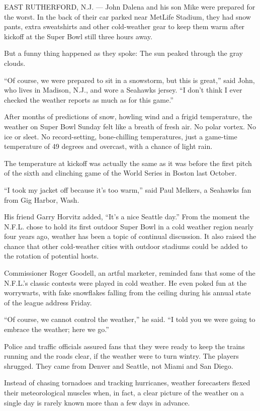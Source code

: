 EAST RUTHERFORD, N.J. --- John Dalena and his son Mike were prepared for
the worst. In the back of their car parked near MetLife Stadium, they
had snow pants, extra sweatshirts and other cold-weather gear to keep
them warm after kickoff at the Super Bowl still three hours away.

But a funny thing happened as they spoke: The sun peaked through the
gray clouds.

``Of course, we were prepared to sit in a snowstorm, but this is
great,'' said John, who lives in Madison, N.J., and wore a Seahawks
jersey. ``I don't think I ever checked the weather reports as much as
for this game.''

After months of predictions of snow, howling wind and a frigid
temperature, the weather on Super Bowl Sunday felt like a breath of
fresh air. No polar vortex. No ice or sleet. No record-setting,
bone-chilling temperatures, just a game-time temperature of 49 degrees
and overcast, with a chance of light rain.

The temperature at kickoff was actually the same as it was before the
first pitch of the sixth and clinching game of the World Series in
Boston last October.

``I took my jacket off because it's too warm,'' said Paul Melkers, a
Seahawks fan from Gig Harbor, Wash.

His friend Garry Horvitz added, ``It's a nice Seattle day.'' From the
moment the N.F.L. chose to hold its first outdoor Super Bowl in a cold
weather region nearly four years ago, weather has been a topic of
continual discussion. It also raised the chance that other cold-weather
cities with outdoor stadiums could be added to the rotation of potential
hosts.

Commissioner Roger Goodell, an artful marketer, reminded fans that some
of the N.F.L.'s classic contests were played in cold weather. He even
poked fun at the worrywarts, with fake snowflakes falling from the
ceiling during his annual state of the league address Friday.

``Of course, we cannot control the weather,'' he said. ``I told you we
were going to embrace the weather; here we go.''

Police and traffic officials assured fans that they were ready to keep
the trains running and the roads clear, if the weather were to turn
wintry. The players shrugged. They came from Denver and Seattle, not
Miami and San Diego.

Instead of chasing tornadoes and tracking hurricanes, weather
forecasters flexed their meteorological muscles when, in fact, a clear
picture of the weather on a single day is rarely known more than a few
days in advance.

